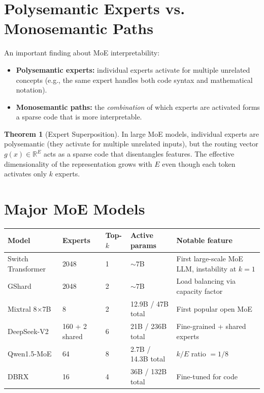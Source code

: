 \documentclass[11pt,a4paper]{book}
\theoremstyle{definition}
\newtheorem{theorem}{Theorem}[chapter]
\begin{document}
\section{Polysemantic Experts vs. Monosemantic Paths}

An important finding about MoE interpretability:

\begin{itemize}
	\item \textbf{Polysemantic experts:} individual experts activate for multiple unrelated concepts (e.g., the same expert handles both code syntax and mathematical notation).
	\item \textbf{Monosemantic paths:} the \emph{combination} of which experts are activated forms a sparse code that is more interpretable.
\end{itemize}

\begin{theorem}[Expert Superposition]
	In large MoE models, individual experts are polysemantic (they activate for multiple unrelated inputs), but the routing vector $g(x) \in \mathbb{R}^E$ acts as a sparse code that disentangles features. The effective dimensionality of the representation grows with $E$ even though each token activates only $k$ experts.
\end{theorem}

\section{Major MoE Models}

\begin{longtable}{p{3cm}p{2.5cm}p{2.5cm}p{2.5cm}p{3cm}}
	\toprule
	\textbf{Model}      & \textbf{Experts} & \textbf{Top-$k$} & \textbf{Active params} & \textbf{Notable feature}                        \\
	\midrule
	Switch Transformer  & 2048             & 1                & $\sim 7$B              & First large-scale MoE LLM, instability at $k=1$ \\
	GShard              & 2048             & 2                & $\sim 7$B              & Load balancing via capacity factor              \\
	Mixtral 8$\times$7B & 8                & 2                & 12.9B / 47B total      & First popular open MoE                          \\
	DeepSeek-V2         & 160 + 2 shared   & 6                & 21B / 236B total       & Fine-grained + shared experts                   \\
	Qwen1.5-MoE         & 64               & 8                & 2.7B / 14.3B total     & $k/E$ ratio $= 1/8$                             \\
	DBRX                & 16               & 4                & 36B / 132B total       & Fine-tuned for code                             \\
	\bottomrule
\end{longtable}
\end{document}
